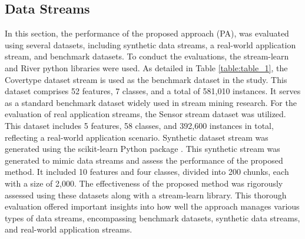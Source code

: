 \subsection{Data Streams}
\label{sec:data_stream}
In this section, the performance of the proposed approach (PA), was evaluated using several datasets, including synthetic data streams, a real-world application stream, and benchmark datasets. To conduct the evaluations, the stream-learn and River python libraries \cite{ksieniewicz2022stream} were used. As detailed in Table \ref{table:table_1}, the Covertype dataset stream is used as the benchmark dataset in the study. This dataset comprises 52 features, 7 classes, and a total of 581,010 instances. It serves as a standard benchmark dataset widely used in stream mining research. For the evaluation of real application streams, the Sensor stream dataset was utilized. This dataset includes 5 features, 58 classes, and 392,600 instances in total, reflecting a real-world application scenario. Synthetic dataset stream was generated using the scikit-learn Python package \cite{ksieniewicz2022stream}. This synthetic stream was generated to mimic data streams and assess the performance of the proposed method. It included 10 features and four classes, divided into 200 chunks, each with a size of 2,000. The effectiveness of the proposed method was rigorously assessed using these datasets along with a stream-learn library. This thorough evaluation offered important insights into how well the approach manages various types of data streams, encompassing benchmark datasets, synthetic data streams, and real-world application streams.

\begin{table}[t]
	\centering
  \caption{The datasets utilized in the experimentation exhibited various characteristics.}
	\label{table:table_1}
	\end{table}

